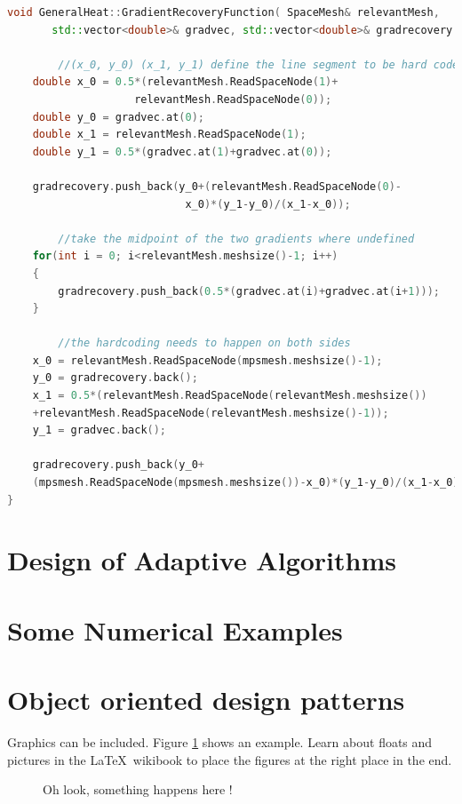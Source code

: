\documentclass{uonmathreport}
\theoremstyle{definition}
\theoremstyle{problem}
\theoremstyle{theorem}
\begin{document}
\begin{lstlisting}[language=C++]
void GeneralHeat::GradientRecoveryFunction( SpaceMesh& relevantMesh,
       std::vector<double>& gradvec, std::vector<double>& gradrecovery ) {
    	
    	//(x_0, y_0) (x_1, y_1) define the line segment to be hard coded
    double x_0 = 0.5*(relevantMesh.ReadSpaceNode(1)+
    				relevantMesh.ReadSpaceNode(0));
    double y_0 = gradvec.at(0);
    double x_1 = relevantMesh.ReadSpaceNode(1);
    double y_1 = 0.5*(gradvec.at(1)+gradvec.at(0));

    gradrecovery.push_back(y_0+(relevantMesh.ReadSpaceNode(0)-
    						x_0)*(y_1-y_0)/(x_1-x_0));
		
		//take the midpoint of the two gradients where undefined
    for(int i = 0; i<relevantMesh.meshsize()-1; i++)
    {
        gradrecovery.push_back(0.5*(gradvec.at(i)+gradvec.at(i+1)));
    }
		
		//the hardcoding needs to happen on both sides
    x_0 = relevantMesh.ReadSpaceNode(mpsmesh.meshsize()-1);
    y_0 = gradrecovery.back();
    x_1 = 0.5*(relevantMesh.ReadSpaceNode(relevantMesh.meshsize())			   
    +relevantMesh.ReadSpaceNode(relevantMesh.meshsize()-1));
    y_1 = gradvec.back();

    gradrecovery.push_back(y_0+
    (mpsmesh.ReadSpaceNode(mpsmesh.meshsize())-x_0)*(y_1-y_0)/(x_1-x_0));
}

\end{lstlisting}



\newpage

\section{Design of Adaptive Algorithms} \label{sec:Adaptive}

\newpage

\section{Some Numerical Examples} \label{sec:Examples}

\newpage

\section{Object oriented design patterns} \label{sec:my2}

Graphics can be included. Figure \ref{fig:bsd} shows an example.
Learn about floats and pictures in the \LaTeX\ wikibook to place
the figures at the right place in the end.
%
\begin{figure}[h]
 \begin{center}
 \end{center}
 \caption{Oh look, something happens here !}
 \label{fig:bsd}
\end{figure}
\end{document}
